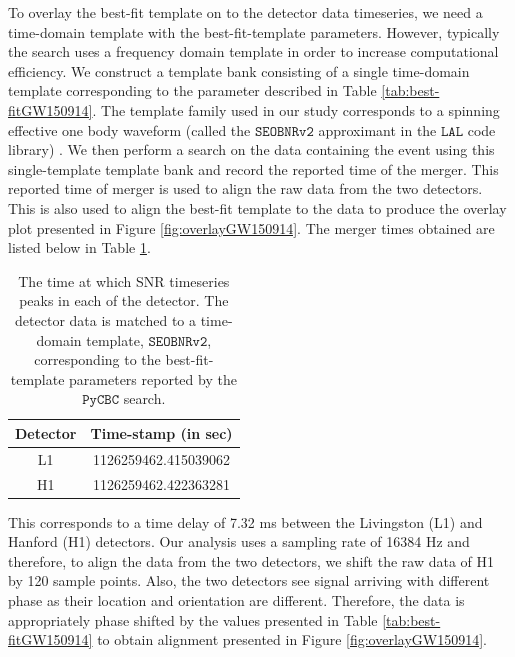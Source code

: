 To overlay the best-fit template on to the detector data timeseries, we need a time-domain template with the best-fit-template parameters. However, typically the search uses a frequency domain template in order to increase computational efficiency. We construct a template bank consisting of a single time-domain template corresponding to the parameter described in Table \ref{tab:best-fitGW150914}. The template family used in our study corresponds to a spinning effective one body waveform (called the $\texttt{SEOBNRv2}$ approximant in the $\texttt{LAL}$ code library)  \cite{SEOBNRv2}. We then perform a search on the data containing the event using this single-template template bank and record the reported time of the merger. This reported time of merger is used to align the raw data from the two detectors. This is also used to align the best-fit template to the data to produce the overlay plot presented in Figure \ref{fig:overlayGW150914}. The merger times obtained are listed below in Table \ref{tab:arrival-time}.


\begin{table}[]
\centering
\begin{tabular}{|c|c|}
\hline
Detector & Time-stamp (in sec)        \\ \hline
L1       & 1126259462.415039062 \\
H1       & 1126259462.422363281 \\ \hline
\end{tabular}
\caption{The time at which SNR timeseries peaks in each of the detector. The detector data is matched to a time-domain template, $\texttt{SEOBNRv2}$, corresponding to the best-fit-template parameters reported by the $\texttt{PyCBC}$ search.}
\label{tab:arrival-time}
\end{table}

This corresponds to a time delay of 7.32 ms between the Livingston (L1) and Hanford (H1) detectors. Our analysis uses a sampling rate of 16384 Hz and therefore, to align the data from the two detectors, we shift the raw data of H1 by 120 sample points. Also, the two detectors see signal arriving with different phase as their location and orientation are different. Therefore, the data is appropriately phase shifted by the values presented in Table \ref{tab:best-fitGW150914} to obtain alignment presented in Figure \ref{fig:overlayGW150914}.

